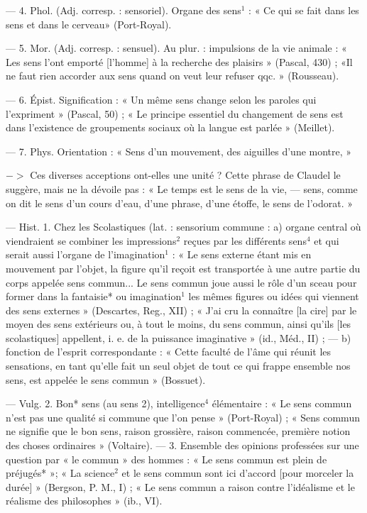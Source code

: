 \begin{itemize}[leftmargin=1cm, label=, itemsep=1pt]
— 4. Phol. (Adj. corresp. : sensoriel). Organe des sens$^1$ : « Ce qui se
fait dans les sens et dans le cerveau»
(Port-Royal).

— 5. Mor. (Adj. corresp. : sensuel). Au plur. : impulsions de la vie
animale : « Les sens l’ont emporté
[l’homme] à la recherche des plaisirs »
(Pascal, 430) ; «Il ne faut rien accorder aux sens quand on veut leur
refuser qqc. » (Rousseau).

— 6. Épist. Signification : « Un
même sens change selon les paroles
qui l’expriment » (Pascal, 50) ; « Le
principe essentiel du changement de
sens est dans l’existence de groupements sociaux où la langue est
parlée » (Meillet).

— 7. Phys. Orientation : « Sens
d’un mouvement, des aiguilles d’une
montre, »

$->$ Ces diverses acceptions ont-elles une unité ? Cette phrase de
Claudel le suggère, mais ne la dévoile
pas : « Le temps est le sens de la vie,
— sens, comme on dit le sens d’un
cours d’eau, d’une phrase, d’une
étoffe, le sens de l'odorat. »

 — Hist. 1. Chez les
Scolastiques (lat. : sensorium commune :
a) organe central où viendraient se combiner les impressions$^2$
reçues par les différents sens$^4$ et qui
serait aussi l'organe de l'imagination$^1$ : « Le sens externe étant mis en
mouvement par l'objet, la figure
qu’il reçoit est transportée à une
autre partie du corps appelée sens
commun... Le sens commun joue
aussi le rôle d’un sceau pour former
dans la fantaisie* ou imagination$^1$
les mêmes figures ou idées qui viennent des sens externes » (Descartes,
Reg., XII) ; « J'ai cru la connaître
[la cire] par le moyen des sens extérieurs ou, à tout le moins, du sens
commun, ainsi qu'ils [les scolastiques] appellent, i. e. de la puissance imaginative » (id., Méd., II) ;
— b) fonction de l'esprit correspondante : « Cette faculté de l’âme qui
réunit les sensations, en tant qu'elle
fait un seul objet de tout ce qui
frappe ensemble nos sens, est appelée
le sens commun » (Bossuet).

— Vulg. 2. Bon* sens (au sens 2),
intelligence$^4$ élémentaire : « Le sens
commun n’est pas une qualité si
commune que l’on pense » (Port-Royal) ; « Sens commun ne signifie
que le bon sens, raison grossière,
raison commencée, première notion
des choses ordinaires » (Voltaire). —
3. Ensemble des opinions professées
sur une question par « le commun »
des hommes : « Le sens commun
est plein de préjugés* »; « La science$^2$
et le sens commun sont ici d'accord
[pour morceler la durée] » (Bergson,
P. M., I) ; « Le sens commun a
raison contre l'idéalisme et le réalisme des philosophes » (ib., VI).


\end{itemize}
